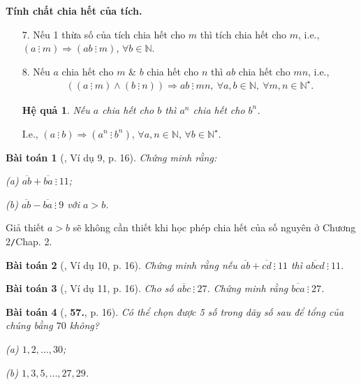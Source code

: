 \documentclass{article}
\numberwithin{equation}{section}
\newtheorem{hequa}{Hệ quả}[section]
\newtheorem{baitoan}{Bài toán}[section]
\begin{document}
\noindent\textbf{Tính chất chia hết của tích.}
\begin{enumerate}
	\item[7.] Nếu 1 thừa số của tích chia hết cho $m$ thì tích chia hết cho $m$, i.e., $(a\ \vdots\ m)\Rightarrow(ab\ \vdots\ m)$, $\forall b\in\mathbb{N}$.
	\item[8.] Nếu $a$ chia hết cho $m$ \& $b$ chia hết cho $n$ thì $ab$ chia hết cho $mn$, i.e.,
	\begin{align*}
		((a\ \vdots\ m)\land(b\ \vdots\ n))\Rightarrow ab\ \vdots\ mn,\ \forall a,b\in\mathbb{N},\ \forall m,n\in\mathbb{N}^\star.
	\end{align*}

	\begin{hequa}
		Nếu $a$ chia hết cho $b$ thì $a^n$ chia hết cho $b^n$.
	\end{hequa}
	I.e., $(a\ \vdots\ b)\Rightarrow(a^n\ \vdots\ b^n)$, $\forall a,n\in\mathbb{N}$, $\forall b\in\mathbb{N}^\star$.
\end{enumerate}

\begin{baitoan}[\cite{Binh_Toan_6_tap_1}, Ví dụ 9, p. 16]
	Chứng minh rằng:
	\begin{enumerate*}
		\item[(a)] $\overline{ab} + \overline{ba}\ \vdots\ 11$;
		\item[(b)] $\overline{ab} - \overline{ba}\ \vdots\ 9$ với $a > b$.
	\end{enumerate*}
\end{baitoan}
Giả thiết $a > b$ sẽ không cần thiết khi học phép chia hết của số nguyên ở Chương 2\texttt{/}Chap. 2.

\begin{baitoan}[\cite{Binh_Toan_6_tap_1}, Ví dụ 10, p. 16]
	Chứng minh rằng nếu $\overline{ab} + \overline{cd}\ \vdots\ 11$ thì $\overline{abcd}\ \vdots\ 11$.
\end{baitoan}

\begin{baitoan}[\cite{Binh_Toan_6_tap_1}, Ví dụ 11, p. 16]
	Cho số $\overline{abc}\ \vdots\ 27$. Chứng minh rằng $\overline{bca}\ \vdots\ 27$.
\end{baitoan}

\begin{baitoan}[\cite{Binh_Toan_6_tap_1}, \textbf{57.}, p. 16]
	Có thể chọn được 5 số trong dãy số sau để tổng của chúng bằng $70$ không?
	\begin{enumerate*}
		\item[(a)] $1,2,\ldots,30$;
		\item[(b)] $1,3,5,\ldots,27,29$.
	\end{enumerate*}
\end{baitoan}
\end{document}
